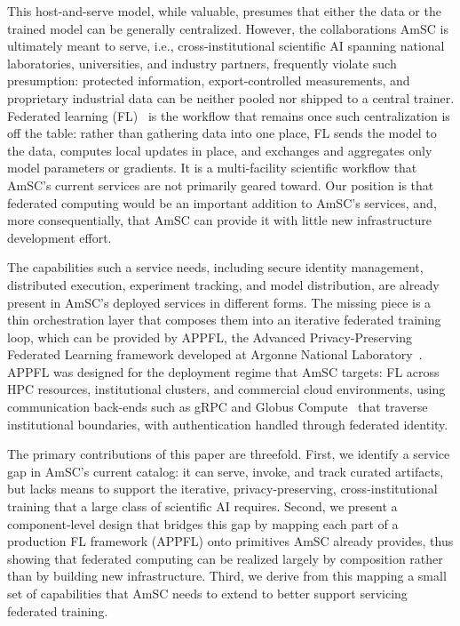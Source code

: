 \documentclass[conference]{IEEEtran}
\begin{document}
This host-and-serve model, while valuable, presumes that either the data or the trained model can be generally centralized. However, the collaborations AmSC is ultimately meant to serve, i.e., cross-institutional scientific AI spanning national laboratories, universities, and industry partners, frequently violate such presumption: protected information, export-controlled measurements, and proprietary industrial data can be neither pooled nor shipped to a central trainer. Federated learning (FL)~\cite{mcmahan2017communication,kairouz2021advances} is the workflow that remains once such centralization is off the table: rather than gathering data into one place, FL sends the model to the data, computes local updates in place, and exchanges and aggregates only model parameters or gradients. It is a multi-facility scientific workflow that AmSC's current services are not primarily geared toward. Our position is that {federated computing} would be an important addition to AmSC's services, and, more consequentially, that AmSC can provide it with little new infrastructure development effort. 

The capabilities such a service needs, including secure identity management, distributed execution, experiment tracking, and model distribution, are already present in AmSC's deployed services in different forms. The missing piece is a thin orchestration layer that composes them into an iterative federated training loop, which can be provided by APPFL, the Advanced Privacy-Preserving Federated Learning framework developed at Argonne National Laboratory~\cite{ryu2022appfl,li2025advances}. APPFL was designed for the deployment regime that AmSC targets: FL across HPC resources, institutional clusters, and commercial cloud environments, using communication back-ends such as gRPC and Globus Compute~\cite{chard2020funcx} that traverse institutional boundaries, with authentication handled through federated identity. 

The primary contributions of this paper are threefold. First, we identify a service gap in AmSC's current catalog: it can serve, invoke, and track curated artifacts, but lacks means to support the iterative, privacy-preserving, cross-institutional training that a large class of scientific AI requires. Second, we present a component-level design that bridges this gap by mapping each part of a production FL framework (APPFL) onto primitives AmSC already provides, thus showing that federated computing can be realized largely by composition rather than by building new infrastructure. Third, we derive from this mapping a small set of capabilities that AmSC needs to extend to better support servicing federated training.
\end{document}
